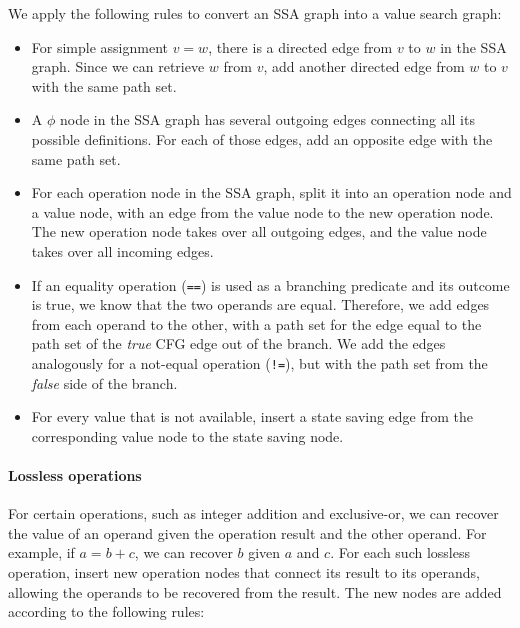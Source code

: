 We apply the following rules to convert an SSA graph into a value search graph:
\begin{itemize}
	\item For simple assignment $v = w$, there is a directed edge from $v$ to $w$ in the SSA graph. 
	Since we can retrieve $w$ from $v$, add another directed edge from $w$ to $v$ with the same path set.

	\item A $\phi$ node in the SSA graph has several outgoing edges connecting all its possible definitions. 
	For each of those edges, add an opposite edge with the same path set. 
	
	\item For each operation node in the SSA graph, split it into an operation node and a value node, with an edge from the value node to the new operation node. 
	The new operation node takes over all outgoing edges, and the value node takes over all incoming edges. 
	
	\item If an equality operation (\texttt{==}) is used as a branching predicate and its outcome is true, we know that the two operands are equal.
	Therefore, we add edges from each operand to the other, with a path set for the edge equal to the path set of the \emph{true} CFG edge out of the branch. 
	We add the edges analogously for a not-equal operation (\texttt{!=}), but with the path set from the \emph{false} side of the branch.
	
	\item For every value that is not available, insert a state saving edge from the corresponding value node to the state saving node. 
\end{itemize}

\paragraph{Lossless operations} For certain operations, such as integer addition and exclusive-or, we can recover the value of an operand given the operation result and the other operand. For example, if $a=b+c$, we can recover $b$ given $a$ and $c$. For each such lossless operation, insert new operation nodes that connect its result to its operands, allowing the operands to be recovered from the result. The new nodes are added according to the following rules:


